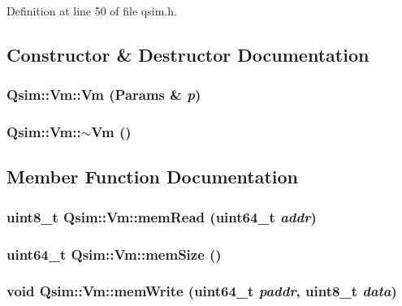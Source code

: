 Definition at line 50 of file qsim.h.

\subsection{Constructor \& Destructor Documentation}
\subsubsection[{Vm}]{\setlength{\rightskip}{0pt plus 5cm}Qsim::Vm::Vm ({\bf Params} \& {\em p})}\label{classQsim_1_1Vm_97cf3a07415924ff1716268918f845e0}


\subsubsection[{$\sim$Vm}]{\setlength{\rightskip}{0pt plus 5cm}Qsim::Vm::$\sim$Vm ()}\label{classQsim_1_1Vm_8d1c24b583a30346ebb951d5a5e84401}




\subsection{Member Function Documentation}
\subsubsection[{memRead}]{\setlength{\rightskip}{0pt plus 5cm}uint8\_\-t Qsim::Vm::memRead (uint64\_\-t {\em addr})}\label{classQsim_1_1Vm_b2cfe5bfaf8eeda5f882023d7a2716e7}


\subsubsection[{memSize}]{\setlength{\rightskip}{0pt plus 5cm}uint64\_\-t Qsim::Vm::memSize ()}\label{classQsim_1_1Vm_c333f61213726dd2fb9dbfd285958161}


\subsubsection[{memWrite}]{\setlength{\rightskip}{0pt plus 5cm}void Qsim::Vm::memWrite (uint64\_\-t {\em paddr}, \/  uint8\_\-t {\em data})}\label{classQsim_1_1Vm_dccef1e0729ae0904fbaa1b87b0e9ff6}


